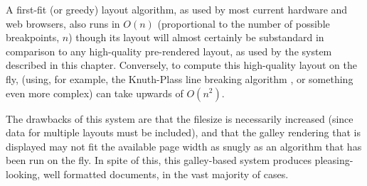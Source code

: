 A first-fit (or greedy) layout algorithm, as used by most current \ebook{} hardware and web browsers, also runs in $O(n)$ (proportional to the number of possible breakpoints, $n$) though its layout will almost certainly be substandard in comparison to any high-quality pre-rendered layout, as used by the system described in this chapter. Conversely, to compute this high-quality layout on the fly, (using, for example, the Knuth-Plass line breaking algorithm \cite{Knuth1981}, or something even more complex) can take upwards of $O(n^2)$.

The drawbacks of this system are that the filesize is necessarily increased (since data for multiple layouts must be included), and that the galley rendering that is displayed may not fit the available page width as snugly as an algorithm that has been run on the fly. In spite of this, this galley-based system produces pleasing-looking, well formatted documents, in the vast majority of cases.




